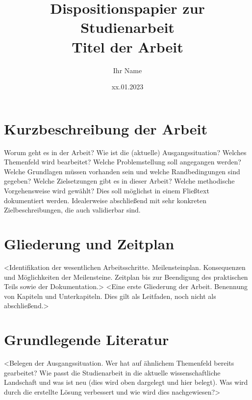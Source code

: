 \documentclass{scrartcl}
\title{Dispositionspapier zur Studienarbeit\\Titel der Arbeit}
\author{ Ihr Name }
\date{xx.01.2023}
\begin{document}
\maketitle

\section{Kurzbeschreibung der Arbeit}
Worum geht es in der Arbeit? Wie ist die (aktuelle) Ausgangssituation? Welches
Themenfeld wird bearbeitet? Welche Problemstellung soll angegangen werden? Welche
Grundlagen müssen vorhanden sein und welche Randbedingungen sind gegeben? Welche
Zielsetzungen gibt es in dieser Arbeit? Welche methodische Vorgehensweise wird
gewählt?  Dies soll möglichst in einem Fließtext dokumentiert werden. Idealerweise
abschließend mit sehr konkreten Zielbeschreibungen, die auch validierbar sind.


\section{Gliederung und Zeitplan}
<Identifikation der wesentlichen Arbeitsschritte. Meilensteinplan. Konsequenzen
und Möglichkeiten der Meilensteine. Zeitplan bis zur Beendigung des praktischen
Teils sowie der Dokumentation.> <Eine erste Gliederung der Arbeit. Benennung von
Kapiteln und Unterkapiteln. Dies gilt als Leitfaden, noch nicht als abschließend.>

\section{Grundlegende Literatur}
<Belegen der Ausgangssituation. Wer hat auf ähnlichem Themenfeld bereits
gearbeitet? Wie passt die Studienarbeit in die aktuelle wissenschaftliche
Landschaft und was ist neu (dies wird oben dargelegt und hier belegt). Was wird
durch die erstellte Lösung verbessert und wie wird dies nachgewiesen?>
\end{document}
